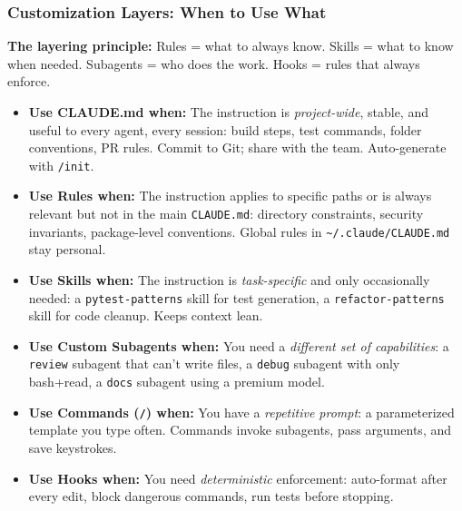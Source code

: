 \begin{frame}[fragile]\frametitle{Customization Layers: When to Use What}

\textbf{The layering principle:} Rules = what to always know. Skills = what to know when needed. Subagents = who does the work. Hooks = rules that always enforce.

  \begin{itemize}
    \item \textbf{Use CLAUDE.md when:} The instruction is \textit{project-wide}, stable, and useful to every agent, every session: build steps, test commands, folder conventions, PR rules. Commit to Git; share with the team. Auto-generate with \texttt{/init}.
    \item \textbf{Use Rules when:} The instruction applies to specific paths or is always relevant but not in the main \texttt{CLAUDE.md}: directory constraints, security invariants, package-level conventions. Global rules in \texttt{\textasciitilde/.claude/CLAUDE.md} stay personal.
    \item \textbf{Use Skills when:} The instruction is \textit{task-specific} and only occasionally needed: a \texttt{pytest-patterns} skill for test generation, a \texttt{refactor-patterns} skill for code cleanup. Keeps context lean.
    \item \textbf{Use Custom Subagents when:} You need a \textit{different set of capabilities}: a \texttt{review} subagent that can't write files, a \texttt{debug} subagent with only bash+read, a \texttt{docs} subagent using a premium model.
    \item \textbf{Use Commands (\texttt{/}) when:} You have a \textit{repetitive prompt}: a parameterized template you type often. Commands invoke subagents, pass arguments, and save keystrokes.
    \item \textbf{Use Hooks when:} You need \textit{deterministic} enforcement: auto-format after every edit, block dangerous commands, run tests before stopping.
  \end{itemize}
\end{frame}

